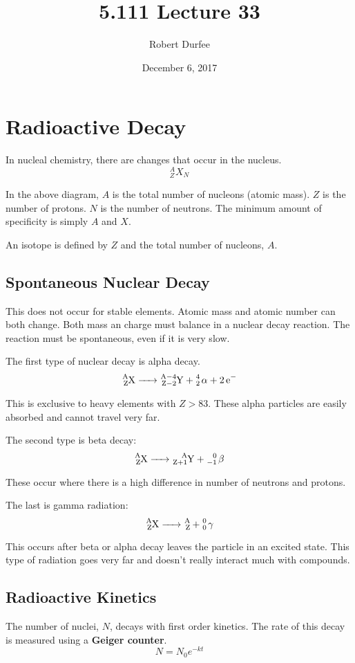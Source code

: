 \documentclass{article}
\title{ 5.111 Lecture 33 }
\author{ Robert Durfee }
\date{ December 6, 2017 }
\begin{document}
\maketitle

\section{ Radioactive Decay }

In nucleal chemistry, there are changes that occur in the nucleus. 
$$ {}^{A}_{Z}X_{N}$$

In the above diagram, $A$ is the total number of nucleons (atomic mass). $Z$ is
the number of protons. $N$ is the number of neutrons. The minimum amount of
specificity is simply $A$ and $X$. 

An isotope is defined by $Z$ and the total number of nucleons, $A$. 

\subsection{ Spontaneous Nuclear Decay }

This does not occur for stable elements. Atomic mass and atomic number can both
change. Both mass an charge must balance in a nuclear decay reaction. The
reaction must be spontaneous, even if it is very slow.

The first type of nuclear decay is alpha decay.
$$ \ce{ {}^{A}_{Z}X -> {}^{A - 4}_{Z - 2}Y + {}^{4}_{2} \alpha^{} + 2e- } $$

This is exclusive to heavy elements with $Z > 83$. These alpha particles are
easily absorbed and cannot travel very far.

The second type is beta decay:
$$ \ce{ {}^{A}_{Z}X -> {}^{A}_{Z + 1}Y + {}_{-1}^{0} \beta } $$

These occur where there is a high difference in number of neutrons and protons.

The last is gamma radiation:
$$ \ce{ {}^{A}_{Z}X -> {}^{A}_{Z} + {}_{0}^{0} \gamma } $$

This occurs after beta or alpha decay leaves the particle in an excited state.
This type of radiation goes very far and doesn't really interact much with
compounds. 

\subsection{ Radioactive Kinetics }

The number of nuclei, $N$, decays with first order kinetics. The rate of this
decay is measured using a \textbf{Geiger counter}.
$$ N = N_{0}e^{-kt} $$
\end{document}
